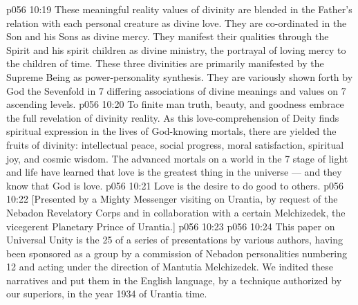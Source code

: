 \vs p056 10:19 These meaningful reality values of divinity are blended in the Father’s relation with each personal creature as divine love. They are co\hyp{}ordinated in the Son and his Sons as divine mercy. They manifest their qualities through the Spirit and his spirit children as divine ministry, the portrayal of loving mercy to the children of time. These three divinities are primarily manifested by the Supreme Being as power\hyp{}personality synthesis. They are variously shown forth by God the Sevenfold in 7 differing associations of divine meanings and values on 7 ascending levels.
\vs p056 10:20 \pc To finite man truth, beauty, and goodness embrace the full revelation of divinity reality. As this love\hyp{}comprehension of Deity finds spiritual expression in the lives of God\hyp{}knowing mortals, there are yielded the fruits of divinity: intellectual peace, social progress, moral satisfaction, spiritual joy, and cosmic wisdom. The advanced mortals on a world in the 7 stage of light and life have learned that love is the greatest thing in the universe --- and they know that God is love.
\vs p056 10:21 \pc Love is the desire to do good to others.
\vsetoff
\vs p056 10:22 [Presented by a Mighty Messenger visiting on Urantia, by request of the Nebadon Revelatory Corps and in collaboration with a certain Melchizedek, the vicegerent Planetary Prince of Urantia.]
\vs p056 10:23 \separatorline
\vs p056 10:24 This paper on Universal Unity is the 25 of a series of presentations by various authors, having been sponsored as a group by a commission of Nebadon personalities numbering 12 and acting under the direction of Mantutia Melchizedek. We indited these narratives and put them in the English language, by a technique authorized by our superiors, in the year 1934 of Urantia time.
\quizlink
